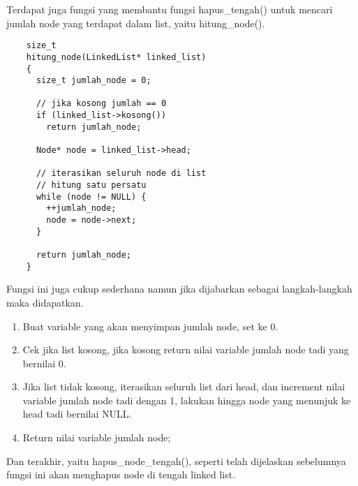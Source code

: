 \documentclass[12pt, a4paper]{article}
\begin{document}
  Terdapat juga fungsi yang membantu fungsi hapus\_tengah() untuk mencari
  jumlah node yang terdapat dalam list, yaitu hitung\_node().

  \vspace{0.5cm}
  \begin{lstlisting}
    size_t
    hitung_node(LinkedList* linked_list)
    {
      size_t jumlah_node = 0;

      // jika kosong jumlah == 0
      if (linked_list->kosong())
        return jumlah_node;

      Node* node = linked_list->head;

      // iterasikan seluruh node di list
      // hitung satu persatu
      while (node != NULL) {
        ++jumlah_node;
        node = node->next;
      }

      return jumlah_node;
    }
  \end{lstlisting}
  \vspace{0.5cm}

  Fungsi ini juga cukup sederhana namun jika dijabarkan sebagai langkah-langkah
  maka didapatkan.

  \begin{enumerate}
    \item Buat variable yang akan menyimpan jumlah node, set ke 0.
    \item Cek jika list kosong, jika kosong return nilai variable
      jumlah node tadi yang bernilai 0.
    \item Jika list tidak kosong, iterasikan seluruh list dari head, dan increment nilai
      variable jumlah node tadi dengan 1, lakukan hingga node yang menunjuk ke head tadi
      bernilai NULL.
    \item Return nilai variable jumlah node;
  \end{enumerate}

  Dan terakhir, yaitu hapus\_node\_tengah(), seperti telah dijelaskan sebelumnya
  fungsi ini akan menghapus node di tengah linked list.
\end{document}
